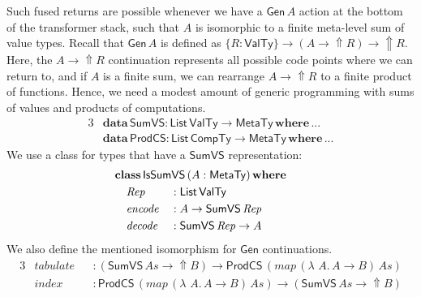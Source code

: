 \documentclass[acmsmall,screen,review,anonymous]{acmart}
\newcommand{\mit}[1]{\mathit{#1}}
\newcommand{\msf}[1]{\mathsf{#1}}
\newcommand{\mbf}[1]{\mathbf{#1}}
\newcommand{\ind}{\hspace{1em}}
\newcommand{\lam}{\lambda\,}
\newcommand{\data}{\mbf{data}\,}
\newcommand{\where}{\mbf{where}}
\newcommand{\M}{\msf{M}}
\newcommand{\map}{\mit{map}}
\newcommand{\List}{\msf{List}}
\newcommand{\Nil}{\msf{Nil}}
\newcommand{\Cons}{\msf{Cons}}
\newcommand{\Lift}{{\Uparrow}}
\newcommand{\Up}{{\Uparrow}}
\newcommand{\MTy}{\msf{MetaTy}}
\newcommand{\VTy}{\msf{ValTy}}
\newcommand{\CTy}{\msf{CompTy}}
\theoremstyle{remark}
\newcommand{\tyclass}{\mbf{class}}
\newcommand{\Gen}{\msf{Gen}}
\newcommand{\SumVS}{\msf{SumVS}}
\newcommand{\ProdCS}{\msf{ProdCS}}
\newcommand{\Here}{\msf{Here}}
\newcommand{\There}{\msf{There}}
\newcommand{\IsSumVS}{\msf{IsSumVS}}
\newcommand{\mAs}{\mit{As}}
\newcommand{\Rep}{\mit{Rep}}
\newcommand{\encode}{\mit{encode}}
\newcommand{\decode}{\mit{decode}}
\newcommand{\mindex}{\mit{index}}
\newcommand{\mtabulate}{\mit{tabulate}}
\begin{document}
Such fused returns are possible whenever we have a $\Gen\,A$ action at the
bottom of the transformer stack, such that $A$ is isomorphic to a finite
meta-level sum of value types. Recall that $\Gen\,A$ is defined as $\{R : \VTy\}
\to (A \to \Up R) \to \Up R$. Here, the $A \to \Up R$ continuation represents
all possible code points where we can return to, and if $A$ is a finite sum, we
can rearrange $A \to \Up R$ to a finite product of functions. Hence, we need a modest
amount of generic programming with sums of values and products of computations.
\begin{alignat*}{3}
  & \data \SumVS : \List\,\VTy \to \MTy\,\where\,...\\
  & \data \ProdCS : \List\,\CTy \to \MTy\,\where\,...
\end{alignat*}
We use a class for types that have a $\SumVS$ representation:
\begin{alignat*}{3}
  & \hspace{-3em}\mathrlap{\tyclass\,\IsSumVS\,(A : \MTy)\,\where} \\
  & \hspace{-3em}\ind \Rep    &&: \List\,\VTy \\
  & \hspace{-3em}\ind \encode &&: A \to \SumVS\,\Rep \\
  & \hspace{-3em}\ind \decode &&: \SumVS\,\Rep \to A
\end{alignat*}
We also define the mentioned isomorphism for $\Gen$ continuations.
\begin{alignat*}{3}
  &\mtabulate &&: (\SumVS\,\mAs \to \Lift B) \to \ProdCS\,(\map\,(\lam\,A.\,A\to B)\,\mAs)\\
  &\mindex    &&: \ProdCS\,(\mit{map}\,(\lam\,A.\,A\to B)\,\mAs) \to (\SumVS\,\mAs \to \Lift B)
\end{alignat*}
\end{document}
